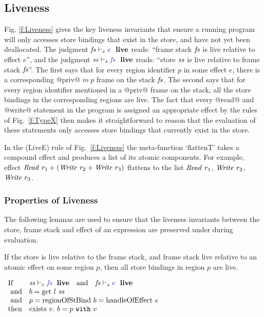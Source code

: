 
\subsection{Liveness}
\label{s:Liveness}
Fig. \ref{f:Liveness} gives the key liveness invariants that ensure a running program will only accesses store bindings that exist in the store, and have not yet been deallocated. The judgment \mbox{$\LiveE{\mfs}{e}$} reads: ``frame stack $\mathit{fs}$ is live relative to effect $e$'', and the judgment $\LiveS{\mss}{\mfs}$ reads: ``store $\mathit{ss}$ is live relative to frame stack $\mathit{fs}$''. The first says that for every region identifier $p$ in some effect $e$, there is a corresponding @priv@ $m~p$ frame on the stack $\mathit{fs}$. The second says that for every region identifier mentioned in a @priv@ frame on the stack, all the store bindings in the corresponding regions are live. The fact that every @read@ and @write@ statement in the program is assigned an appropriate effect by the rules of Fig.~\ref{f:TypeX} then makes it straightforward to reason that the evaluation of these statements only accesses store bindings that currently exist in the store.

In the (LiveE) rule of Fig.~\ref{f:Liveness} the meta-function `flattenT' takes a compound effect and produces a list of its atomic components. For example, effect $\mathit{Read}~ r_1 + (\mathit{Write}~ r_2 + \mathit{Write}~ r_3)$ flattens to the list $\mathit{Read}~ r_1$, $\mathit{Write}~ r_2$, $\mathit{Write}~ r_3$. 


\subsubsection{Properties of Liveness}
The following lemmas are used to ensure that the liveness invariants between the store, frame stack and effect of an expression are preserved under during evaluation. 


%
\begin{lemma} 
\label{l:liveS_liveE_value}
If the store is live relative to the frame stack, and frame stack live relative to an atomic effect on some region $p$, then all store bindings in region $p$ are live.
\end{lemma}
$
\begin{array}{ll}
    \pIf    & \LiveE{\mss}{\mfs} ~~~\pand~~~ \LiveS{\mfs}{e}
\\  ~\pand  & b = \mget~ l~ \mss
\\  ~\pand  & p = \mregionOfStBind~ b = \mhandleOfEffect~ e
\\  \pthen  & \pexists~ v.~ b = \sbvalue{p}{v}
\end{array}
$
\qqed


